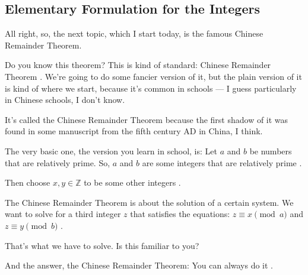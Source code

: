 \subsection{Elementary Formulation for the Integers}

\begin{speech}[01:07:17 - 01:08:58]
All right, so, the next topic, which I start today, is the famous Chinese Remainder Theorem.

Do you know this theorem? This is kind of standard: Chinese Remainder Theorem . We're going to do some fancier version of it, but the plain version of it is kind of where we start, because it's common in schools --- I guess particularly in Chinese schools, I don't know.

It's called the Chinese Remainder Theorem because the first shadow of it was found in some manuscript from the fifth century AD in China, I think.

The very basic one, the version you learn in school, is: Let $a$ and $b$ be numbers that are relatively prime. So, $a$ and $b$ are some integers that are relatively prime .

Then choose $x, y \in \mathbb{Z}$ to be some other integers .

The Chinese Remainder Theorem is about the solution of a certain system. We want to solve for a third integer $z$ that satisfies the equations: $z \equiv x \pmod a$ and $z \equiv y \pmod b$ .

That's what we have to solve. Is this familiar to you?

And the answer, the Chinese Remainder Theorem: You can always do it .
\end{speech}

\begin{content}
\end{content}

